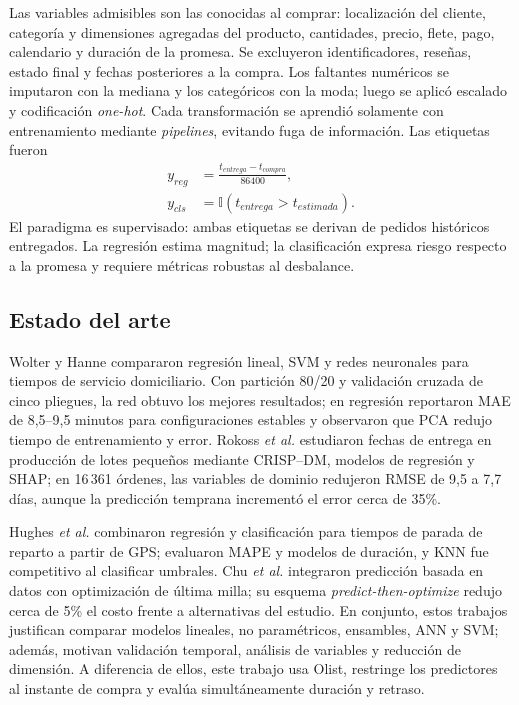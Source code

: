 \documentclass[journal]{IEEEtran}
\begin{document}
Las variables admisibles son las conocidas al comprar: localización del cliente, categoría y dimensiones agregadas del producto, cantidades, precio, flete, pago, calendario y duración de la promesa. Se excluyeron identificadores, reseñas, estado final y fechas posteriores a la compra. Los faltantes numéricos se imputaron con la mediana y los categóricos con la moda; luego se aplicó escalado y codificación \emph{one-hot}. Cada transformación se aprendió solamente con entrenamiento mediante \emph{pipelines}, evitando fuga de información. Las etiquetas fueron
\begin{equation}
\begin{aligned}
y_{reg}&=\frac{t_{entrega}-t_{compra}}{86400},\\
y_{cls}&=\mathbb{I}(t_{entrega}>t_{estimada}).
\end{aligned}
\end{equation}
El paradigma es supervisado: ambas etiquetas se derivan de pedidos históricos entregados. La regresión estima magnitud; la clasificación expresa riesgo respecto a la promesa y requiere métricas robustas al desbalance.

\subsection{Estado del arte}
Wolter y Hanne \cite{wolter2024} compararon regresión lineal, SVM y redes neuronales para tiempos de servicio domiciliario. Con partición 80/20 y validación cruzada de cinco pliegues, la red obtuvo los mejores resultados; en regresión reportaron MAE de 8,5--9,5 minutos para configuraciones estables y observaron que PCA redujo tiempo de entrenamiento y error. Rokoss \emph{et al.} \cite{rokoss2024} estudiaron fechas de entrega en producción de lotes pequeños mediante CRISP--DM, modelos de regresión y SHAP; en 16\,361 órdenes, las variables de dominio redujeron RMSE de 9,5 a 7,7 días, aunque la predicción temprana incrementó el error cerca de 35\%.

Hughes \emph{et al.} \cite{hughes2019} combinaron regresión y clasificación para tiempos de parada de reparto a partir de GPS; evaluaron MAPE y modelos de duración, y KNN fue competitivo al clasificar umbrales. Chu \emph{et al.} \cite{chu2023} integraron predicción basada en datos con optimización de última milla; su esquema \emph{predict-then-optimize} redujo cerca de 5\% el costo frente a alternativas del estudio. En conjunto, estos trabajos justifican comparar modelos lineales, no paramétricos, ensambles, ANN y SVM; además, motivan validación temporal, análisis de variables y reducción de dimensión. A diferencia de ellos, este trabajo usa Olist, restringe los predictores al instante de compra y evalúa simultáneamente duración y retraso.
\end{document}
